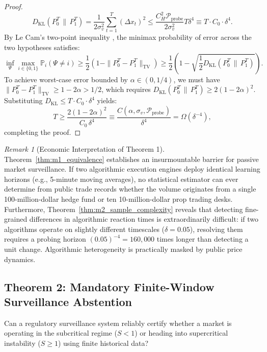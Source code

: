 \documentclass[12pt]{article}
\theoremstyle{definition}
\theoremstyle{remark}
\newtheorem{remark}[theorem]{Remark}
\begin{document}
\begin{proof}
\begin{equation}
D_{\text{KL}}\left(P_0^T \,\|\, P_1^T\right) = \frac{1}{2 \sigma_v^2} \sum_{t=1}^T \left( \Delta x_t \right)^2 \le \frac{C_H^2 \mathcal{P}_{\text{probe}}}{2 \sigma_v^2} T \delta^4 \equiv T \cdot C_0 \cdot \delta^4.
\end{equation}
By Le Cam's two-point inequality \citep{lecam1986}, the minimax probability of error across the two hypotheses satisfies:
\begin{equation}
\inf_{\Psi} \max_{i \in \{0, 1\}} \mathbb{P}_i(\Psi \neq i) \ge \frac{1}{2} \left( 1 - \|P_0^T - P_1^T\|_{\text{TV}} \right) \ge \frac{1}{2} \left( 1 - \sqrt{\frac{1}{2} D_{\text{KL}}(P_0^T \,\|\, P_1^T)} \right).
\end{equation}
To achieve worst-case error bounded by $\alpha \in (0, 1/4)$, we must have $\|P_0^T - P_1^T\|_{\text{TV}} \ge 1 - 2\alpha > 1/2$, which requires $D_{\text{KL}}(P_0^T \,\|\, P_1^T) \ge 2 (1 - 2\alpha)^2$.
Substituting $D_{\text{KL}} \le T \cdot C_0 \cdot \delta^4$ yields:
\begin{equation}
T \ge \frac{2 (1 - 2\alpha)^2}{C_0 \, \delta^4} \equiv \frac{C(\alpha, \sigma_v, \mathcal{P}_{\text{probe}})}{\delta^4} = \Omega(\delta^{-4}),
\end{equation}
completing the proof.
\end{proof}

\begin{remark}[Economic Interpretation of Theorem 1]
Theorem~\ref{thm:m1_equivalence} establishes an insurmountable barrier for passive market surveillance. If two algorithmic execution engines deploy identical learning horizons (e.g., 5-minute moving averages), no statistical estimator can ever determine from public trade records whether the volume originates from a single 100-million-dollar hedge fund or ten 10-million-dollar prop trading desks. 
Furthermore, Theorem~\ref{thm:m2_sample_complexity} reveals that detecting fine-grained differences in algorithmic reaction times is extraordinarily difficult: if two algorithms operate on slightly different timescales ($\delta = 0.05$), resolving them requires a probing horizon $(0.05)^{-4} = 160{,}000$ times longer than detecting a unit change. Algorithmic heterogeneity is practically masked by public price dynamics.
\end{remark}

\subsection{Theorem 2: Mandatory Finite-Window Surveillance Abstention}
Can a regulatory surveillance system reliably certify whether a market is operating in the subcritical regime ($S < 1$) or heading into supercritical instability ($S \ge 1$) using finite historical data?
\end{document}

